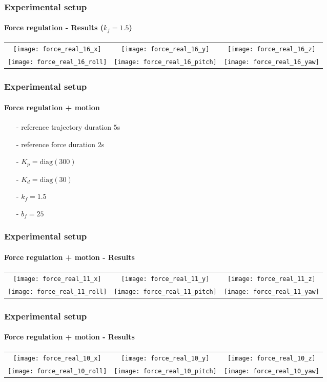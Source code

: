 \begin{frame}
  \frametitle{Experimental setup}
  \framesubtitle{Force regulation - Results ($k_{f} = 1.5$)}
  \begin{center}
   \vskip-0.1in
    \begin{tabular}{ccc}
      \texttt{[image: force\_real\_16\_x]} &
      \texttt{[image: force\_real\_16\_y]} &
      \texttt{[image: force\_real\_16\_z]} \\
      \texttt{[image: force\_real\_16\_roll]} &
      \texttt{[image: force\_real\_16\_pitch]} &
      \texttt{[image: force\_real\_16\_yaw]}
    \end{tabular}
  \end{center}
\end{frame}

\begin{frame}
  \frametitle{Experimental setup}
  \framesubtitle{Force regulation + motion}
  \begin{itemize}
  \item[-] reference trajectory duration $5$s
  \item[-] reference force duration $2$s
  \item[-] $K_p = \mathrm{diag}(300)$
  \item[-] $K_d = \mathrm{diag}(30)$
  \item[-] $k_{f} = 1.5$
  \item[-] $b_f = 25$
  \end{itemize}
\end{frame}

\begin{frame}
  \frametitle{Experimental setup}
  \framesubtitle{Force regulation + motion - Results}
  \begin{center}
   \vskip-0.1in
    \begin{tabular}{ccc}
      \texttt{[image: force\_real\_11\_x]} &
      \texttt{[image: force\_real\_11\_y]} &
      \texttt{[image: force\_real\_11\_z]} \\
      \texttt{[image: force\_real\_11\_roll]} &
      \texttt{[image: force\_real\_11\_pitch]} &
      \texttt{[image: force\_real\_11\_yaw]}
    \end{tabular}
  \end{center}
\end{frame}

\begin{frame}
  \frametitle{Experimental setup}
  \framesubtitle{Force regulation + motion - Results}
  \begin{center}
   \vskip-0.1in
    \begin{tabular}{ccc}
      \texttt{[image: force\_real\_10\_x]} &
      \texttt{[image: force\_real\_10\_y]} &
      \texttt{[image: force\_real\_10\_z]} \\
      \texttt{[image: force\_real\_10\_roll]} &
      \texttt{[image: force\_real\_10\_pitch]} &
      \texttt{[image: force\_real\_10\_yaw]}
    \end{tabular}
  \end{center}
\end{frame}
